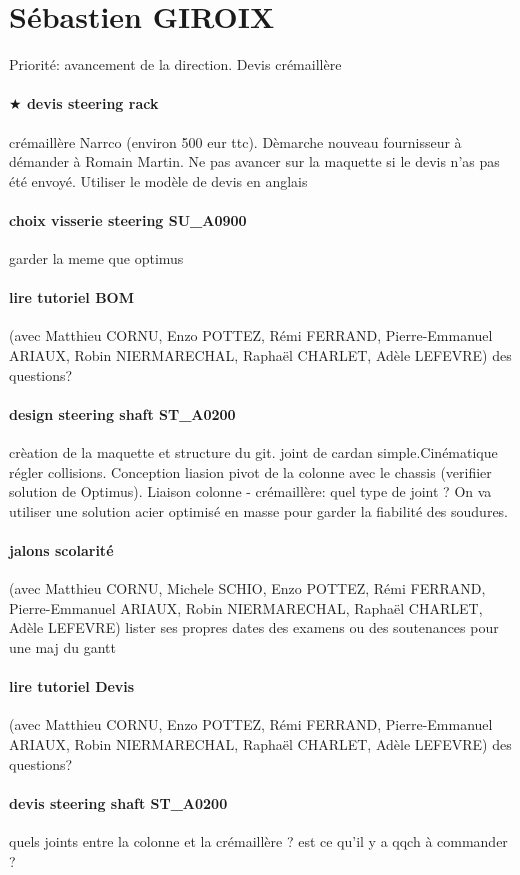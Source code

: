 
 
 \newpage \section*{Sébastien GIROIX} 
 \par Priorité: avancement de la direction. Devis crémaillère
\paragraph{$\bigstar$ devis steering rack} crémaillère Narrco (environ 500 eur ttc). Dèmarche nouveau fournisseur à démander à Romain Martin. Ne pas avancer sur la maquette si le devis n'as pas été envoyé. Utiliser le modèle de devis en anglais
\paragraph{choix visserie steering SU\_A0900} garder la meme que optimus
\paragraph{lire tutoriel BOM} (avec Matthieu CORNU, Enzo POTTEZ, Rémi FERRAND, Pierre-Emmanuel ARIAUX, Robin NIERMARECHAL, Raphaël CHARLET, Adèle LEFEVRE) des questions?
\paragraph{design steering shaft ST\_A0200} crèation de la maquette et structure du git. joint de cardan simple.Cinématique régler collisions. Conception liasion pivot de la colonne avec le chassis (verifiier solution de Optimus). Liaison colonne - crémaillère: quel type de joint ? On va utiliser une solution acier optimisé en masse pour garder la fiabilité des soudures.
\paragraph{jalons scolarité} (avec Matthieu CORNU, Michele SCHIO, Enzo POTTEZ, Rémi FERRAND, Pierre-Emmanuel ARIAUX, Robin NIERMARECHAL, Raphaël CHARLET, Adèle LEFEVRE) lister ses propres dates des examens ou des soutenances pour une maj du gantt
\paragraph{lire tutoriel Devis} (avec Matthieu CORNU, Enzo POTTEZ, Rémi FERRAND, Pierre-Emmanuel ARIAUX, Robin NIERMARECHAL, Raphaël CHARLET, Adèle LEFEVRE) des questions?
\paragraph{devis steering shaft ST\_A0200} quels joints entre la colonne et la crémaillère ? est ce qu'il y a qqch à commander ?
